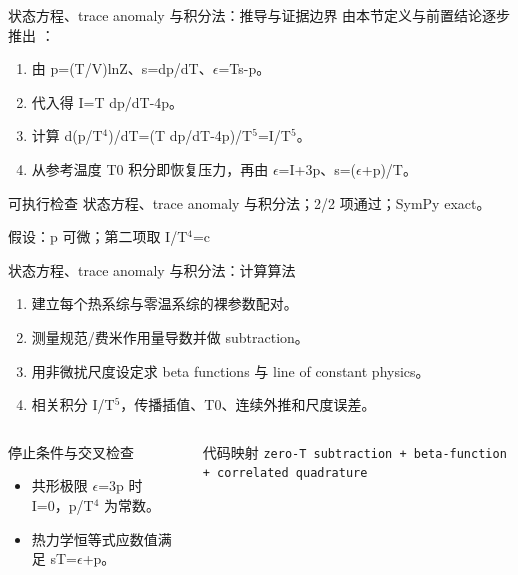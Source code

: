 \begin{frame}[t]{状态方程、trace anomaly 与积分法：推导与证据边界}
\footnotesize
{}\quad 由本节定义与前置结论逐步推出 ：
\begin{enumerate}
\item 由 p=(T/\allowbreak{}V)lnZ、s=dp/\allowbreak{}dT、\ensuremath{\epsilon}=Ts-p。
\item 代入得 I=T dp/\allowbreak{}dT-4p。
\item 计算 d(p/\allowbreak{}T\ensuremath{^{4}})/\allowbreak{}dT=(T dp/\allowbreak{}dT-4p)/\allowbreak{}T\ensuremath{^{5}}=I/\allowbreak{}T\ensuremath{^{5}}。
\item 从参考温度 T0 积分即恢复压力，再由 \ensuremath{\epsilon}=I+3p、s=(\ensuremath{\epsilon}+p)/\allowbreak{}T。
\end{enumerate}\begin{block}{可执行检查}
\quad 状态方程、trace anomaly 与积分法；2/2 项通过；SymPy exact。
\par\scriptsize 假设：p 可微；第二项取 I/\allowbreak{}T\ensuremath{^{4}}=c
\end{block}
\end{frame}

\begin{frame}[t]{状态方程、trace anomaly 与积分法：计算算法}
\footnotesize
{}\begin{enumerate}
\item 建立每个热系综与零温系综的裸参数配对。
\item 测量规范/\allowbreak{}费米作用量导数并做 subtraction。
\item 用非微扰尺度设定求 beta functions 与 line of constant physics。
\item 相关积分 I/\allowbreak{}T\ensuremath{^{5}}，传播插值、T0、连续外推和尺度误差。
\end{enumerate}\begin{columns}[T,onlytextwidth]
\begin{block}{停止条件与交叉检查}\scriptsize\begin{itemize}
\item[\CheckMark] 共形极限 \ensuremath{\epsilon}=3p 时 I=0，p/\allowbreak{}T\ensuremath{^{4}} 为常数。
\item[\CheckMark] 热力学恒等式应数值满足 sT=\ensuremath{\epsilon}+p。
\end{itemize}\end{block}
\begin{block}{代码映射}
\scriptsize \texttt{zero-T subtraction + beta-function + correlated quadrature}
\end{block}\end{columns}\end{frame}

